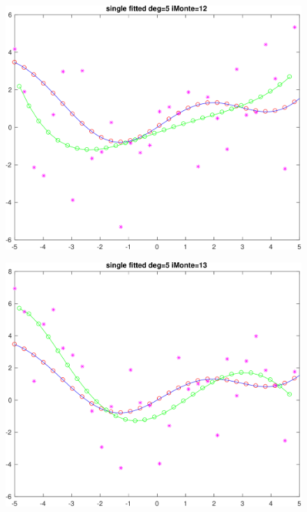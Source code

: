 \documentclass[11pt]{article}
\begin{document}
\begin{figure}[h!]
\centering\includegraphics[scale=0.1]{single_poly_d_5_iMonte_12.png}
\end{figure}



\begin{figure}[h!]
\centering\includegraphics[scale=0.1]{single_poly_d_5_iMonte_13.png}
\end{figure}
\end{document}
